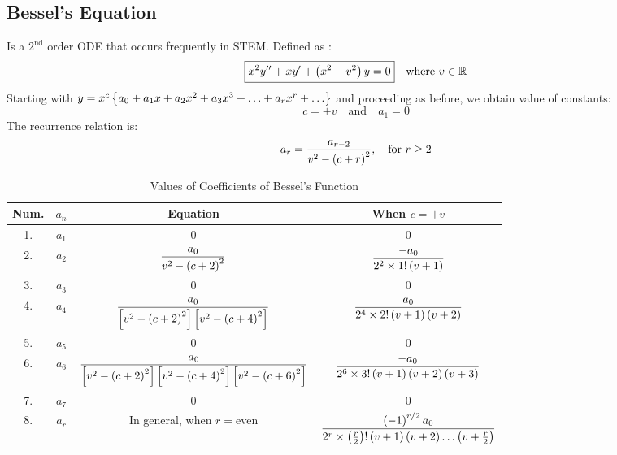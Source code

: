 \subsection{Bessel's Equation}
Is a $2^\text{nd}$ order ODE that occurs frequently in STEM. Defined as :
\begin{align}
    \boxed{x^2y''+xy'+\left(x^2-v^2\right)y=0}\quad\text{where } v\in\mathbb{R}
\end{align}
Starting with $y=x^c\left\{a_0+a_1x+a_2x^2+a_3x^3+\ldots+a_rx^r+\ldots\right\}$ and proceeding as before, we obtain value of constants:
\begin{equation}
    c=\pm v\quad \text{and}\quad a_1=0
\end{equation}
The recurrence relation is:
\begin{equation}
    a_r=\frac{a_{r-2}}{v^2-\left(c+r\right)^2},\quad\text{for }r\geq2
\end{equation}\vspace{-2ex}
\begin{table}[H]
    \centering
    \renewcommand{\arraystretch}{2.2}
    \caption{Values of Coefficients of Bessel's Function}
    \label{table:4.2}
    \begin{tabular}{|c|c|c|c|}\hline
       Num.&$a_n$&Equation&When $c=+v$\\ \hline
       1.&$a_1$&$0$&0\\
       2.&$a_2$&$\displaystyle\frac{a_0}{v^2-\left(c+2\right)^2}$&$\displaystyle \frac{-a_0}{2^2\times1!\left(v+1\right)}$\\
       3.&$a_3$&$0$&0\\
       4.&$a_4$&$\displaystyle \frac{a_0}{\left[v^2-\left(c+2\right)^2\right]\left[v^2-\left(c+4\right)^2\right]}$&$\displaystyle\frac{a_0}{2^4\times2!\left(v+1\right)\left(v+2\right)}$\\
       5.&$a_5$&$0$&0\\
       6.&$\displaystyle a_6$&$\displaystyle \frac{a_0}{\left[v^2-\left(c+2\right)^2\right]\left[v^2-\left(c+4\right)^2\right]\left[v^2-\left(c+6\right)^2\right]}$&$\displaystyle\frac{-a_0}{2^6\times 3!\left(v+1\right)\left(v+2\right)\left(v+3\right)}$\\
       7.&$a_7$&$0$&0\\\hline
       8.&$a_r$&In general, when $r=$even&$\displaystyle\frac{\left(-1\right)^{r/2}a_0}{2^r\times \left(\frac{r}{2}\right)!\left(v+1\right)\left(v+2\right)\ldots\left(v+\frac{r}{2}\right)}$ \\\hline
    \end{tabular}
\end{table}\vspace{-1ex}
